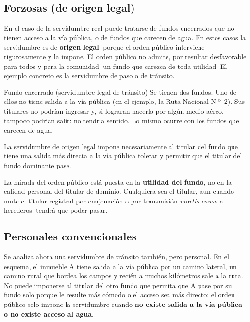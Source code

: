 \documentclass[12pt,oneside]{book}
\begin{document}
\subsection{Forzosas (de origen legal)}

En el caso de la servidumbre real puede tratarse de fundos encerrados que no tienen acceso a la vía pública, o de fundos que carecen de agua. En estos casos la servidumbre es de \textbf{origen legal}, porque el orden público interviene rigurosamente y la impone. El orden público no admite, por resultar desfavorable para todos y para la comunidad, un fundo que carezca de toda utilidad. El ejemplo concreto es la servidumbre de paso o de tránsito.

\begin{example}{Fundo encerrado (servidumbre legal de tránsito)}
Se tienen dos fundos. Uno de ellos no tiene salida a la vía pública (en el ejemplo, la Ruta Nacional N.º~2). Sus titulares no podrían ingresar y, si lograran hacerlo por algún medio aéreo, tampoco podrían salir: no tendría sentido. Lo mismo ocurre con los fundos que carecen de agua.

La servidumbre de origen legal impone necesariamente al titular del fundo que tiene una salida más directa a la vía pública tolerar y permitir que el titular del fundo dominante pase.
\end{example}

\begin{important}
La mirada del orden público está puesta en la \textbf{utilidad del fundo}, no en la calidad personal del titular de dominio. Cualquiera sea el titular, aun cuando mute el titular registral por enajenación o por transmisión \textit{mortis causa} a herederos, tendrá que poder pasar.
\end{important}

\subsection{Personales convencionales}

Se analiza ahora una servidumbre de tránsito también, pero personal. En el esquema, el inmueble A tiene salida a la vía pública por un camino lateral, un camino rural que bordea los campos y recién a muchos kilómetros sale a la ruta. No puede imponerse al titular del otro fundo que permita que A pase por su fundo solo porque le resulte más cómodo o el acceso sea más directo: el orden público solo impone la servidumbre cuando \textbf{no existe salida a la vía pública o no existe acceso al agua}.
\end{document}
